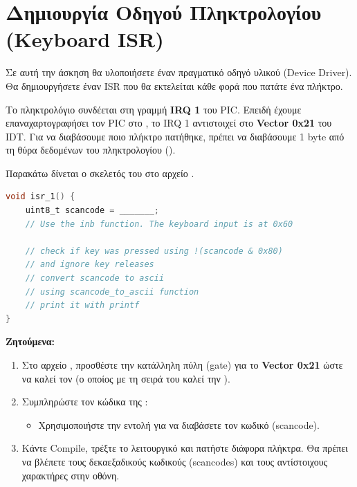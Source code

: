 \documentclass[18pt]{extarticle}
\begin{document}
\newpage

\section{Δημιουργία Οδηγού Πληκτρολογίου (Keyboard ISR)}

Σε αυτή την άσκηση θα υλοποιήσετε έναν πραγματικό οδηγό υλικού (Device Driver). Θα δημιουργήσετε έναν ISR που θα εκτελείται κάθε φορά που πατάτε ένα πλήκτρο.

Το πληκτρολόγιο συνδέεται στη γραμμή \textbf{IRQ 1} του PIC. Επειδή έχουμε επαναχαρτογραφήσει τον PIC στο , το IRQ 1 αντιστοιχεί στο \textbf{Vector 0x21} του IDT.
Για να διαβάσουμε ποιο πλήκτρο πατήθηκε, πρέπει να διαβάσουμε 1 byte από τη θύρα δεδομένων του πληκτρολογίου ().

\begin{question}
    Παρακάτω δίνεται ο σκελετός του  στο αρχείο .

    \begin{file}
    \footnotesize \begin{lstlisting}[language=C, tabsize=2]
void isr_1() {
    uint8_t scancode = _______; 
    // Use the inb function. The keyboard input is at 0x60

    // check if key was pressed using !(scancode & 0x80) 
    // and ignore key releases
    // convert scancode to ascii 
    // using scancode_to_ascii function
    // print it with printf
}
    \end{lstlisting}
    \end{file}

    \textbf{Ζητούμενα:}

    \begin{enumerate}
        \item Στο αρχείο , προσθέστε την κατάλληλη πύλη (gate) για το \textbf{Vector 0x21} ώστε να καλεί τον  (ο οποίος με τη σειρά του καλεί την ).
        \item Συμπληρώστε τον κώδικα της :
        \begin{itemize}
            \item Χρησιμοποιήστε την εντολή  για να διαβάσετε τον κωδικό (scancode).
        \end{itemize}
        \item Κάντε Compile, τρέξτε το λειτουργικό και πατήστε διάφορα πλήκτρα. Θα πρέπει να βλέπετε τους δεκαεξαδικούς κωδικούς (scancodes) και τους αντίστοιχους χαρακτήρες στην οθόνη.
    \end{enumerate}

\end{question}
\end{document}
